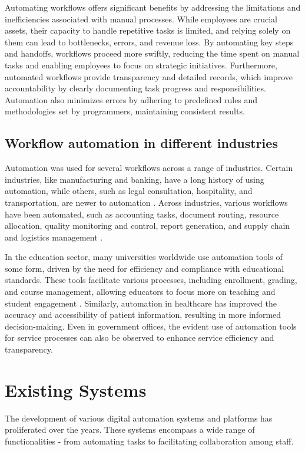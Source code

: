 Automating workflows offers significant benefits by addressing the limitations and inefficiencies associated with manual processes. While employees are crucial assets, their capacity to handle repetitive tasks is limited, and relying solely on them can lead to bottlenecks, errors, and revenue loss. By automating key steps and handoffs, workflows proceed more swiftly, reducing the time spent on manual tasks and enabling employees to focus on strategic initiatives. Furthermore, automated workflows provide transparency and detailed records, which improve accountability by clearly documenting task progress and responsibilities. Automation also minimizes errors by adhering to predefined rules and methodologies set by programmers, maintaining consistent results.

\subsection{Workflow automation in different industries}

Automation was used for several workflows across a range of industries. Certain industries, like manufacturing and banking, have a long history of using automation, while others, such as legal consultation, hospitality, and transportation, are newer to automation \cite{caban2021}. Across industries, various workflows have been automated, such as accounting tasks, document routing, resource allocation, quality monitoring and control, report generation, and supply chain and logistics management \cite{aguirre2017, mcquilken2014}.

In the education sector, many universities worldwide use automation tools of some form, driven by the need for efficiency and compliance with educational standards. These tools facilitate various processes, including enrollment, grading, and course management, allowing educators to focus more on teaching and student engagement \cite{choudhary2024}. Similarly, automation in healthcare has improved the accuracy and accessibility of patient information, resulting in more informed decision-making. Even in government offices, the evident use of automation tools for service processes can also be observed to enhance service efficiency and transparency. 

\section{Existing Systems}

The development of various digital automation systems and platforms has proliferated over the years. These systems encompass a wide range of functionalities - from automating tasks to facilitating collaboration among staff.

